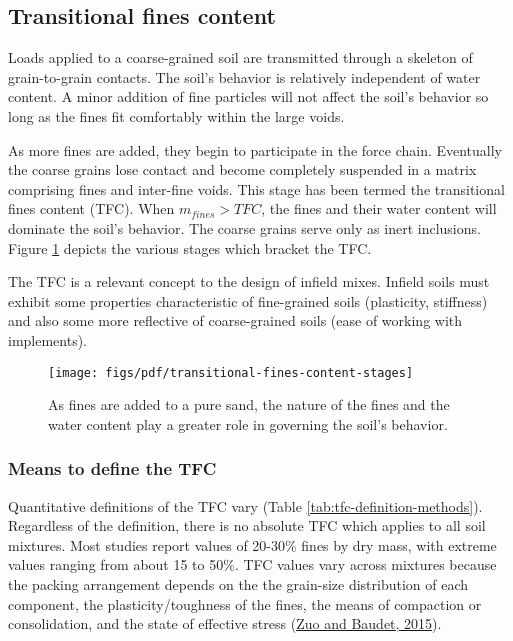 \documentclass[
  letterpaper,
  openany]{book}
\begin{document}
\newpage

\hypertarget{transitional-fines-content}{%
\subsection{Transitional fines content}\label{transitional-fines-content}}

Loads applied to a coarse-grained soil are transmitted through a skeleton of grain-to-grain contacts.
The soil's behavior is relatively independent of water content.
A minor addition of fine particles will not affect the soil's behavior so long as the fines fit comfortably within the large voids.

As more fines are added, they begin to participate in the force chain.
Eventually the coarse grains lose contact and become completely suspended in a matrix comprising fines and inter-fine voids.
This stage has been termed the transitional fines content (TFC).
When \(m_{fines} > TFC\), the fines and their water content will dominate the soil's behavior. The coarse grains serve only as inert inclusions.
Figure \ref{fig:tfc-stages} depicts the various stages which bracket the TFC.

The TFC is a relevant concept to the design of infield mixes.
Infield soils must exhibit some properties characteristic of fine-grained soils (plasticity, stiffness) and also some more reflective of coarse-grained soils (ease of working with implements).

\begin{figure}

{\centering \texttt{[image: figs/pdf/transitional-fines-content-stages]} 

}

\caption[Major stages bracketing the transitional fines content.]{As fines are added to a pure sand, the nature of the fines and the water content play a greater role in governing the soil's behavior.}\label{fig:tfc-stages}
\end{figure}

\hypertarget{means-to-define-the-tfc}{%
\subsubsection{Means to define the TFC}\label{means-to-define-the-tfc}}

Quantitative definitions of the TFC vary (Table \ref{tab:tfc-definition-methods}).
Regardless of the definition, there is no absolute TFC which applies to all soil mixtures.
Most studies report values of 20-30\% fines by dry mass, with extreme values ranging from about 15 to 50\%.
TFC values vary across mixtures because the packing arrangement depends on the the grain-size distribution of each component, the plasticity/toughness of the fines, the means of compaction or consolidation, and the state of effective stress (\protect\hyperlink{ref-Zuo2015}{Zuo and Baudet, 2015}).
\end{document}
